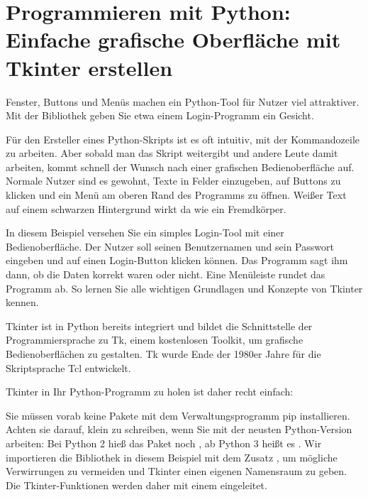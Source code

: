 %
%
%
%





\chapter{Programmieren mit Python: Einfache grafische Oberfläche mit Tkinter erstellen}

Fenster, Buttons und Menüs machen ein Python-Tool für Nutzer viel attraktiver. Mit der Bibliothek  geben Sie etwa einem Login-Programm ein Gesicht.

Für den Ersteller eines Python-Skripts ist es oft intuitiv, mit der Kommandozeile zu arbeiten. Aber sobald man das Skript weitergibt und andere Leute damit arbeiten, kommt schnell der Wunsch nach einer grafischen Bedienoberfläche auf. Normale Nutzer sind es gewohnt, Texte in Felder einzugeben, auf Buttons zu klicken und ein Menü am oberen Rand des Programms zu öffnen. Weißer Text auf einem schwarzen Hintergrund wirkt da wie ein Fremdkörper.

In diesem Beispiel versehen Sie ein simples Login-Tool mit einer Bedienoberfläche. Der Nutzer soll seinen Benutzernamen und sein Passwort eingeben und auf einen Login-Button klicken können. Das Programm sagt ihm dann, ob die Daten korrekt waren oder nicht. Eine Menüleiste rundet das Programm ab. So lernen Sie alle wichtigen Grundlagen und Konzepte von Tkinter kennen.

Tkinter ist in Python bereits integriert und bildet die Schnittstelle der Programmiersprache zu Tk, einem kostenlosen Toolkit, um grafische Bedienoberflächen zu gestalten. Tk wurde Ende der 1980er Jahre für die Skriptsprache Tcl entwickelt.

Tkinter in Ihr Python-Programm zu holen ist daher recht einfach:

\medskip


\medskip

Sie müssen vorab keine Pakete mit dem Verwaltungsprogramm pip installieren. Achten sie darauf,  klein zu schreiben, wenn Sie mit der neusten Python-Version arbeiten: Bei Python 2 hieß das Paket noch , ab Python 3 heißt es . Wir importieren die Bibliothek in diesem Beispiel mit dem Zusatz , um mögliche Verwirrungen zu vermeiden und Tkinter einen eigenen Namensraum zu geben. Die Tkinter-Funktionen werden daher mit einem  eingeleitet.

